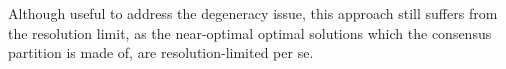 Although useful to address the degeneracy issue, this approach still suffers from the resolution limit, as the near-optimal optimal solutions which the consensus partition is made of, are resolution-limited per se.





